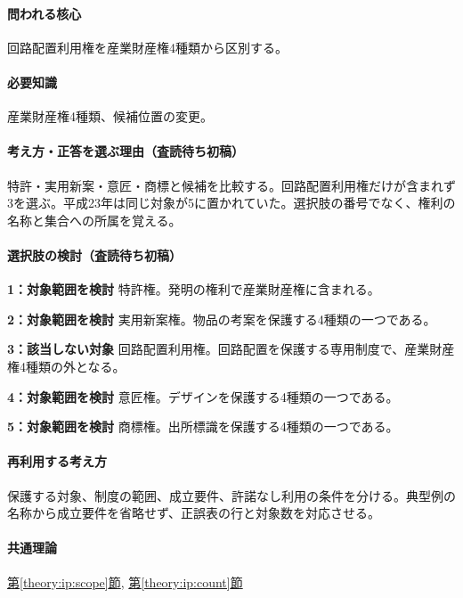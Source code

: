 \paragraph{問われる核心} 回路配置利用権を産業財産権4種類から区別する。

\paragraph{必要知識} 産業財産権4種類、候補位置の変更。

\paragraph{考え方・正答を選ぶ理由（査読待ち初稿）} 特許・実用新案・意匠・商標と候補を比較する。回路配置利用権だけが含まれず3を選ぶ。平成23年は同じ対象が5に置かれていた。選択肢の番号でなく、権利の名称と集合への所属を覚える。

\paragraph{選択肢の検討（査読待ち初稿）}\mbox{}\par

\noindent\textbf{1：対象範囲を検討} 特許権。発明の権利で産業財産権に含まれる。\par

\noindent\textbf{2：対象範囲を検討} 実用新案権。物品の考案を保護する4種類の一つである。\par

\noindent\textbf{3：該当しない対象} 回路配置利用権。回路配置を保護する専用制度で、産業財産権4種類の外となる。\par

\noindent\textbf{4：対象範囲を検討} 意匠権。デザインを保護する4種類の一つである。\par

\noindent\textbf{5：対象範囲を検討} 商標権。出所標識を保護する4種類の一つである。\par

\paragraph{再利用する考え方} 保護する対象、制度の範囲、成立要件、許諾なし利用の条件を分ける。典型例の名称から成立要件を省略せず、正誤表の行と対象数を対応させる。

\paragraph{共通理論} \hyperref[theory:ip:scope]{第\ref*{theory:ip:scope}節}, \hyperref[theory:ip:count]{第\ref*{theory:ip:count}節}

